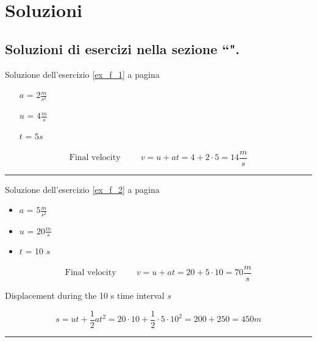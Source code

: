 \section{Soluzioni}

\subsection*{Soluzioni di esercizi nella sezione ``\textbf{}".}

Soluzione dell'esercizio \ref{ex_f_1} a pagina \pageref{ex_f_1}\label{sol_f_1}

\begin{itemize}
\item[$a$] = $2\frac{m}{s^2}$
\item[$u$] = $4\frac{m}{s}$
\item[$t$] = $5s$
\end{itemize}


\begin{equation}
\textrm{Final velocity}\hspace{1cm}
v = u + at = 4 + 2\cdot 5 = 14 \frac{m}{s}
\end{equation}


\vspace{1cm}
\hrule
\vspace{1cm}

Soluzione dell'esercizio \ref{ex_f_2} a pagina \pageref{ex_f_2}\label{sol_f_2}

\begin{itemize}
\item $a$ = $5 \frac{m}{s^2}$
\item $u$ = $20 \frac{m}{s}$
\item $t$ = 10 $s$
\end{itemize}


\begin{equation}
\textrm{Final velocity}\hspace{1cm}
v = u + at = 20 + 5\cdot 10 = 70 \frac{m}{s}
\end{equation}

Displacement during the 10 s time interval $s$

\begin{equation}
s = ut + \frac{1}{2}at^2
= 20 \cdot 10 + \frac{1}{2}\cdot 5 \cdot 10^2
= 200 + 250 = 450 m
\end{equation}



\vspace{1cm}
\hrule
\vspace{1cm}


